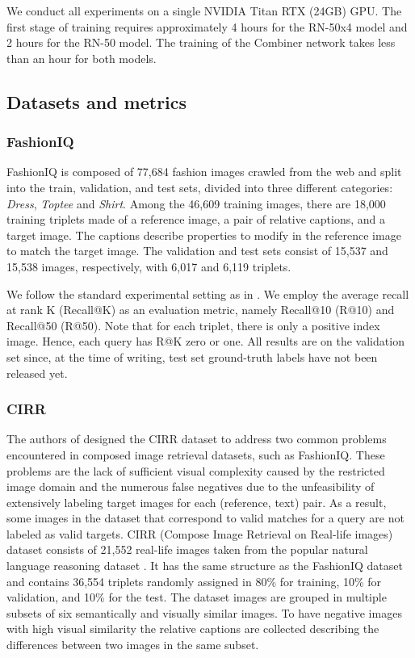 \documentclass[acmlarge]{acmart}
\begin{document}
We conduct all experiments on a single NVIDIA Titan RTX (24GB) GPU. The first stage of training requires approximately 4 hours for the RN-50x4 model and 2 hours for the RN-50 model. The training of the Combiner network takes less than an hour for both models.

\subsection{Datasets and metrics}\label{sec:dataset}

\subsubsection{FashionIQ}
FashionIQ \cite{wu2021fashion} is composed of 77,684 fashion images crawled from the web and split into the train, validation, and test sets, divided into three different categories: \textit{Dress}, \textit{Toptee} and \textit{Shirt}. Among the 46,609 training images, there are 18,000 training triplets made of a reference image, a pair of relative captions, and a target image. The captions describe properties to modify in the reference image to match the target image. 
The validation and test sets consist of 15,537 and 15,538 images, respectively, with 6,017 and 6,119 triplets. 


We follow the standard experimental setting as in \cite{Lee_2021_CVPR, Kim_Yu_Kim_Kim_2021}. We employ the average recall at rank K (Recall@K) as an evaluation metric, namely Recall@10 (R@10) and Recall@50 (R@50). Note that for each triplet, there is only a positive index image. Hence, each query has R@K zero or one.
All results are on the validation set since, at the time of writing, test set ground-truth labels have not been released yet.


\subsubsection{CIRR} The authors of \cite{liu2021image} designed the CIRR dataset to address two common problems encountered in composed image retrieval datasets, such as FashionIQ. These problems are the lack of sufficient visual complexity caused by the restricted image domain and the numerous false negatives due to the unfeasibility of extensively labeling target images for each (reference, text) pair. As a result, some images in the dataset that correspond to valid matches for a query are not labeled as valid targets.
CIRR (Compose Image Retrieval on Real-life images) dataset consists of 21,552 real-life images taken from the popular natural language reasoning  dataset \cite{suhr2019corpus}. It has the same structure as the FashionIQ dataset and contains 36,554 triplets randomly assigned in 80\% for training, 10\% for validation, and 10\% for the test.
The dataset images are grouped in multiple subsets of six semantically and visually similar images. To have negative images with high visual similarity the relative captions are collected describing the differences between two images in the same subset. 
\end{document}
